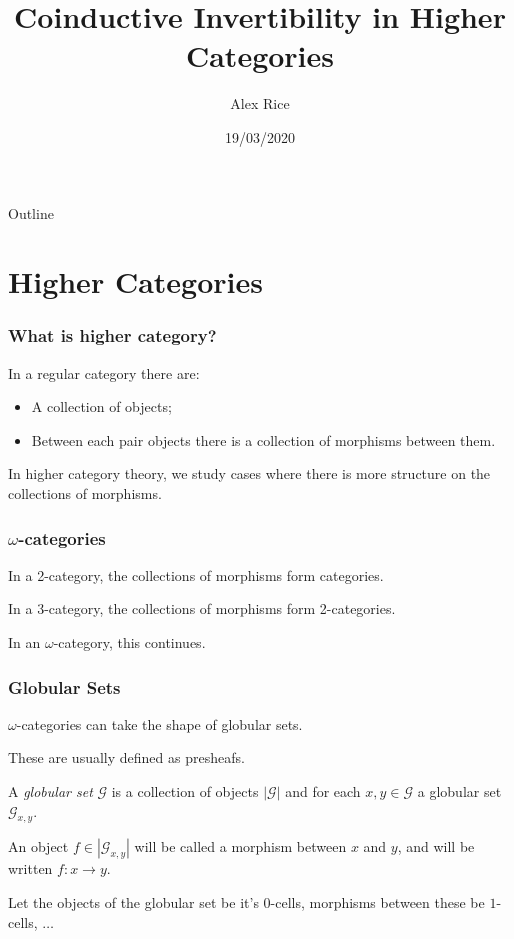 \documentclass[presentation]{beamer}
\author{Alex Rice}
\date{19/03/2020}
\title{Coinductive Invertibility in Higher Categories}
\begin{document}
\maketitle
\begin{frame}{Outline}
  \tableofcontents
\end{frame}

\section{Higher Categories}

\begin{frame}
  \frametitle{What is higher category?}
  In a regular category there are:
  \begin{itemize}
  \item A collection of objects;
  \item Between each pair objects there is a collection of morphisms between them.
  \end{itemize}
  \pause{}
  In higher category theory, we study cases where there is more structure on the collections of morphisms.
\end{frame}

\begin{frame}
  \frametitle{\(\omega\)-categories}
  In a 2-category, the collections of morphisms form categories.
  \pause{}

  In a 3-category, the collections of morphisms form 2-categories.
  \pause{}

  In an \(\omega\)-category, this continues.
\end{frame}

\begin{frame}
  \frametitle{Globular Sets}
  \(\omega\)-categories can take the shape of globular sets.
  \pause{}

  These are usually defined as presheafs.
  \pause{}
  \begin{definition}
    A \emph{globular set} \(\mathcal{G}\) is a collection of objects \(|\mathcal{G}|\) and for each \(x,y \in \mathcal{G}\) a globular set \(\mathcal{G}_{x,y}\).
  \end{definition}

  \pause{}
  An object \(f \in |\mathcal{G}_{x,y}|\) will be called a morphism between \(x\) and \(y\), and will be written \(f : x \to y\).

  \pause{}
  Let the objects of the globular set be it's \(0\)-cells, morphisms between these be \(1\)-cells, \(\dots\)

\end{frame}
\end{document}
